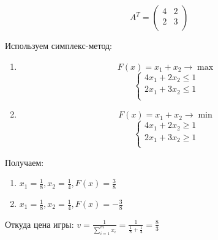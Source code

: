 \documentclass[9pt, a4paper]{article}
\begin{document}
    \begin{equation}
        A^T =
        \begin{pmatrix}
            4 & 2 \\
            2 & 3 \\
        \end{pmatrix}\label{eq:equation21}
    \end{equation}

    Используем симплекс-метод:
    \begin{enumerate}
        \item
        \begin{equation}
            F(x) = x_1 + x_2 \rightarrow \max\label{eq:equation22}
        \end{equation}
        \begin{equation}
            \begin{cases}
                4x_1 + 2x_2 \leqslant 1\\
                2x_1 + 3x_2 \leqslant 1\\
            \end{cases}\label{eq:equation23}
        \end{equation}

        \item
        \begin{equation}
            F(x) = x_1 + x_2 \rightarrow \min\label{eq:equation24}
        \end{equation}
        \begin{equation}
            \begin{cases}
                4x_1 + 2x_2 \geqslant 1\\
                2x_1 + 3x_2 \geqslant 1\\
            \end{cases}\label{eq:equation25}
        \end{equation}
    \end{enumerate}

    Получаем:

    \begin{enumerate}
        \item $x_1 = \frac{1}{8}, x_2 = \frac{1}{4}, F(x) = \frac{3}{8}$
        \item $x_1 = \frac{1}{8}, x_2 = \frac{1}{4}, F(x) = -\frac{3}{8}$
    \end{enumerate}

    Откуда цена игры: $v = \frac{1}{\sum_{i=1}^m x_i} = \frac{1}{\frac{1}{8} + \frac{1}{4}} = \frac{8}{3}$
\end{document}
